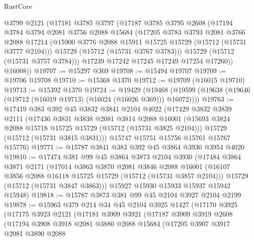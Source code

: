 \begin{lexlean}{RustCore}
\begin{coremodule}
        @3799
        @2121
        (@17181
          @3785
          @3797
          (@17187
            @3785
            @3795
            @2608
            (@17194
              @3784
              @3794
              @2081
              @3756
              @2088
              @15684
              (@17205
                @3783
                @3793
                @2081
                @3766
                @2088
                @17214
                (@15900 @3776 @2088 @15911 @15725 @15729 (@15712 (@15731 @3777 @2104)))
                @15729
                (@15712 (@15731 @3767 @3783)))
              @15729
              (@15712 (@15731 @3757 @3784)))
            @17239
            @17242
            @17245
            @17249
            @17254
            @17260))
        @16008))
@19707 := @15297 @369
@19708 := @15494 @19707
@19709 := @19706 @19708
@19710 := @15368 @1370
@19712 := @19709 (@16015 @19710)
@19713 := @15392 @1370
@19724 := @19429
    (@19468 (@19599 (@19638 (@19646 (@19712 (@16019 @19713) (@16024 (@16026 @369))) @16072))))
@19763 := @17419
    @383
    @392
    @45
    @3832
    @3841
    @2104
    @4022
    (@17429
      @3832
      @3839
      @2111
      (@17436
        @3831
        @3838
        @2081
        @3814
        @2088
        @16001
        (@15693 @3824 @2088 @15718 @15725 @15729 (@15712 (@15731 @3825 @2104)))
        @15729
        (@15712 (@15731 @3815 @3831)))
      @15747
      @15751
      @15756
      @15761
      @15767
      @15776)
@19771 := @15787 @3841 @383 @392 @45 @3864 @3930 @3954 @4020
@19810 := @17474
    @381
    @99
    @45
    @3864
    @3873
    @2104
    @3930
    (@17484
      @3864
      @3871
      @2171
      (@17014
        @3863
        @3870
        @2081
        @3846
        @2088
        @16001
        (@16107 @3856 @2088 @16118 @15725 @15729 (@15712 (@15731 @3857 @2104)))
        @15729
        (@15712 (@15731 @3847 @3863)))
      @15927
      @15930
      @15933
      @15937
      @15942
      @15948)
@19818 := @15787 @3873 @381 @99 @45 @2104 @3927 @2104 @2199
@19878 := @15963
    @379
    @214
    @34
    @45
    @2104
    @3925
    @1427
    (@17170
      @3925
      (@17175
        @3923
        @2121
        (@17181
          @3909
          @3921
          (@17187
            @3909
            @3919
            @2608
            (@17194
              @3908
              @3918
              @2081
              @3880
              @2088
              @15684
              (@17205
                @3907
                @3917
                @2081
                @3890
                @2088

\end{coremodule}
\end{lexlean}
